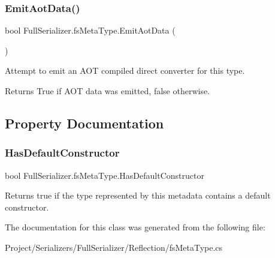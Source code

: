 \subsubsection{\texorpdfstring{Emit\+Aot\+Data()}{EmitAotData()}}
{\footnotesize\ttfamily bool Full\+Serializer.\+fs\+Meta\+Type.\+Emit\+Aot\+Data (\begin{DoxyParamCaption}{ }\end{DoxyParamCaption})\hspace{0.3cm}{\ttfamily [inline]}}



Attempt to emit an A\+OT compiled direct converter for this type. 

\begin{DoxyReturn}{Returns}
True if A\+OT data was emitted, false otherwise.
\end{DoxyReturn}


\subsection{Property Documentation}
\mbox{\label{class_full_serializer_1_1fs_meta_type_a52a664ae78a50823e1cca55d4a5cd12f}} 
\subsubsection{\texorpdfstring{Has\+Default\+Constructor}{HasDefaultConstructor}}
{\footnotesize\ttfamily bool Full\+Serializer.\+fs\+Meta\+Type.\+Has\+Default\+Constructor\hspace{0.3cm}{\ttfamily [get]}}



Returns true if the type represented by this metadata contains a default constructor. 



The documentation for this class was generated from the following file\+:\begin{DoxyCompactItemize}
\item 
Project/\+Serializers/\+Full\+Serializer/\+Reflection/fs\+Meta\+Type.\+cs\end{DoxyCompactItemize}
